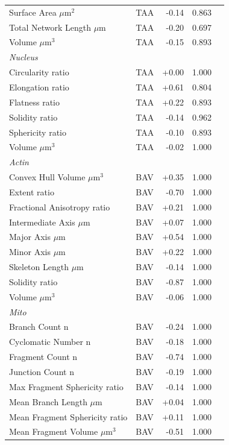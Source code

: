 \documentclass[11pt,a4paper]{article}
\begin{document}
\begin{longtable}{llrrr}
  Surface Area $\mu$m$^{2}$ & TAA & -0.14 & 0.863 &  \\
  Total Network Length $\mu$m & TAA & -0.20 & 0.697 &  \\
  Volume $\mu$m$^{3}$ & TAA & -0.15 & 0.893 &  \\
\midrule
\multicolumn{5}{l}{\textit{Nucleus}} \\
  Circularity ratio & TAA & +0.00 & 1.000 &  \\
  Elongation ratio & TAA & +0.61 & 0.804 &  \\
  Flatness ratio & TAA & +0.22 & 0.893 &  \\
  Solidity ratio & TAA & -0.14 & 0.962 &  \\
  Sphericity ratio & TAA & -0.10 & 0.893 &  \\
  Volume $\mu$m$^{3}$ & TAA & -0.02 & 1.000 &  \\
\midrule
\multicolumn{5}{l}{\textit{Actin}} \\
  Convex Hull Volume $\mu$m$^{3}$ & BAV & +0.35 & 1.000 &  \\
  Extent ratio & BAV & -0.70 & 1.000 &  \\
  Fractional Anisotropy ratio & BAV & +0.21 & 1.000 &  \\
  Intermediate Axis $\mu$m & BAV & +0.07 & 1.000 &  \\
  Major Axis $\mu$m & BAV & +0.54 & 1.000 &  \\
  Minor Axis $\mu$m & BAV & +0.22 & 1.000 &  \\
  Skeleton Length $\mu$m & BAV & -0.14 & 1.000 &  \\
  Solidity ratio & BAV & -0.87 & 1.000 &  \\
  Volume $\mu$m$^{3}$ & BAV & -0.06 & 1.000 &  \\
\midrule
\multicolumn{5}{l}{\textit{Mito}} \\
  Branch Count n & BAV & -0.24 & 1.000 &  \\
  Cyclomatic Number n & BAV & -0.18 & 1.000 &  \\
  Fragment Count n & BAV & -0.74 & 1.000 &  \\
  Junction Count n & BAV & -0.19 & 1.000 &  \\
  Max Fragment Sphericity ratio & BAV & -0.14 & 1.000 &  \\
  Mean Branch Length $\mu$m & BAV & +0.04 & 1.000 &  \\
  Mean Fragment Sphericity ratio & BAV & +0.11 & 1.000 &  \\
  Mean Fragment Volume $\mu$m$^{3}$ & BAV & -0.51 & 1.000 &  \\

\end{longtable}
\end{document}
